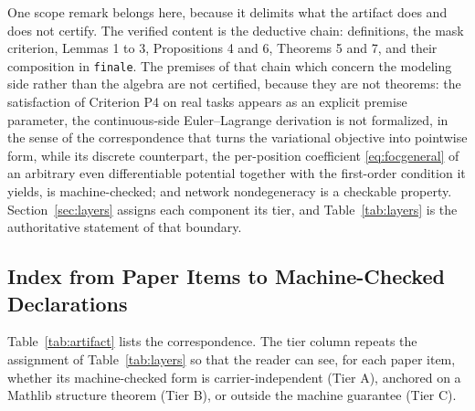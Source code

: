 One scope remark belongs here, because it delimits what the artifact does and does not certify. The verified content is the deductive chain: definitions, the mask criterion, Lemmas 1 to 3, Propositions 4 and 6, Theorems 5 and 7, and their composition in \texttt{finale}. The premises of that chain which concern the modeling side rather than the algebra are not certified, because they are not theorems: the satisfaction of Criterion P4 on real tasks appears as an explicit premise parameter, the continuous-side Euler--Lagrange derivation is not formalized, in the sense of the correspondence that turns the variational objective into pointwise form, while its discrete counterpart, the per-position coefficient \eqref{eq:focgeneral} of an arbitrary even differentiable potential together with the first-order condition it yields, is machine-checked; and network nondegeneracy is a checkable property. Section~\ref{sec:layers} assigns each component its tier, and Table~\ref{tab:layers} is the authoritative statement of that boundary.

\subsection{Index from Paper Items to Machine-Checked Declarations}

Table~\ref{tab:artifact} lists the correspondence. The tier column repeats the assignment of Table~\ref{tab:layers} so that the reader can see, for each paper item, whether its machine-checked form is carrier-independent (Tier A), anchored on a Mathlib structure theorem (Tier B), or outside the machine guarantee (Tier C).

